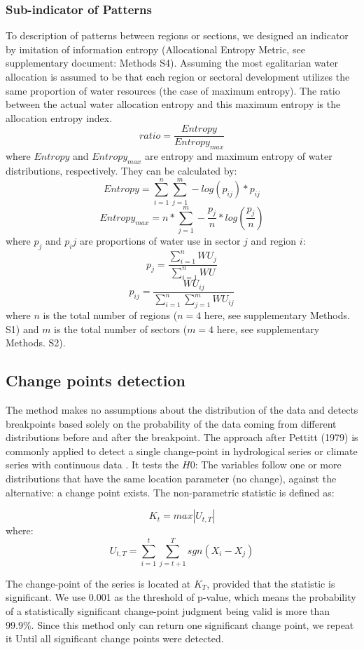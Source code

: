 \documentclass[9pt, twocolumn, twoside, lineno]{pnas-new}
\begin{document}
{	\subsubsection*{Sub-indicator of Patterns}
	To description of patterns between regions or sections, we designed an indicator by imitation of information entropy (Allocational Entropy Metric, see supplementary document: Methods S4). Assuming the most egalitarian water allocation is assumed to be that each region or sectoral development utilizes the same proportion of water resources (the case of maximum entropy). The ratio between the actual water allocation entropy and this maximum entropy is the allocation entropy index.
	$$ ratio = \frac{Entropy}{Entropy_{max}} $$
	where $Entropy$ and $Entropy_{max}$ are entropy and maximum entropy of water distributions, respectively. They can be calculated by:
	$$ Entropy = \sum_{i=1}^n \sum_{j=1}^m -log(p_{ij}) * p_{ij} $$
	$$ Entropy_{max} = n * \sum_{j=1}^m -\frac{p_j}{n} * log(\frac{p_j}{n}) $$ 
	where $p_j$ and $p_ij$ are proportions of water use in sector $j$ and region $i$:
	$$ p_j = \frac{\sum_{i=1}^n WU_j}{\sum_{i=1}^n WU} $$
	$$ p_{ij} = \frac{WU_{ij}} {\sum_{i=1}^n \sum_{j=1}^m WU_{ij}} $$
	where $n$ is the total number of regions ($n=4$ here, see supplementary Methods. S1) and $m$ is the total number of sectors ($m=4$ here, see supplementary Methods. S2).

	\subsection*{Change points detection}
		The method makes no assumptions about the distribution of the data and detects breakpoints based solely on the probability of the data coming from different distributions before and after the breakpoint.
		The approach after Pettitt (1979) is commonly applied to detect a single change-point in hydrological series or climate series with continuous data \cite{pettittNonParametricApproachChangePoint1979}. It tests the $H0$: The variables follow one or more distributions that have the same location parameter (no change), against the alternative: a change point exists. The non-parametric statistic is defined as:
	
		$$ K_t = max|U_{t, T}|$$
		where:
		$$ U_{t, T} = \sum_{i=1}^t\sum_{j=t+1}^T sgn(X_i - X_j) $$
	
		The change-point of the series is located at $K_T$, provided that the statistic is significant. We use 0.001 as the threshold of p-value, which means the probability of a statistically significant change-point judgment being valid is more than $99.9\%$. Since this method only can return one significant change point, we repeat it Until all significant change points were detected.
	
}
\end{document}
